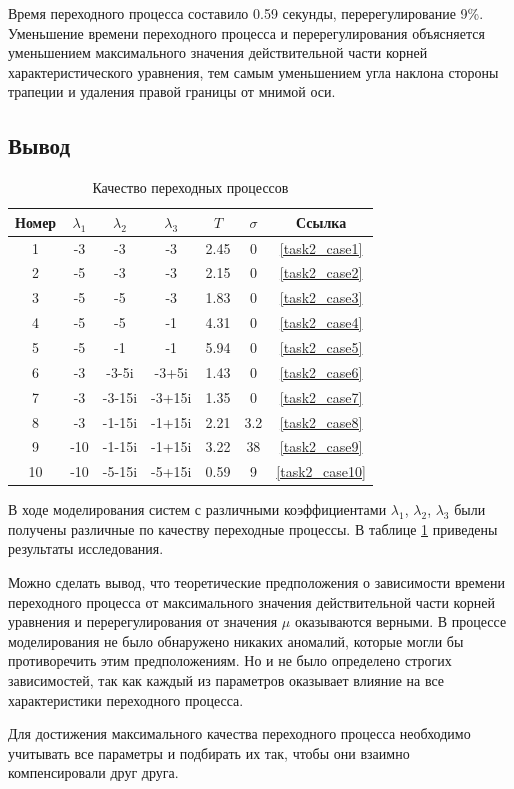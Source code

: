 Время переходного процесса составило 0.59 секунды, перерегулирование 9\%.
Уменьшение времени переходного процесса и перерегулирования объясняется уменьшением
максимального значения действительной части корней характеристического уравнения, 
тем самым уменьшением угла наклона стороны трапеции и удаления правой границы от мнимой оси.

\FloatBarrier
\subsection{Вывод}
\begin{table}[ht!]
    \centering
    \begin{tabular}{|c|c|c|c|c|c|c|}
        \hline
        Номер & $\lambda_1$ & $\lambda_2$ & $\lambda_3$ & $T$ & $\sigma$ & Ссылка  \\
        \hline
        1 & -3 & -3 & -3 & 2.45 & 0 & \ref{task2_case1} \\
        \hline
        2 & -5 & -3 & -3 & 2.15 & 0 & \ref{task2_case2} \\
        \hline
        3 & -5 & -5 & -3 & 1.83 & 0 & \ref{task2_case3} \\
        \hline
        4 & -5 & -5 & -1 & 4.31 & 0 & \ref{task2_case4} \\
        \hline
        5 & -5 & -1 & -1 & 5.94 & 0 & \ref{task2_case5} \\
        \hline
        6 & -3 & -3-5i & -3+5i & 1.43 & 0 & \ref{task2_case6} \\
        \hline
        7 & -3 & -3-15i & -3+15i & 1.35 & 0 & \ref{task2_case7} \\
        \hline
        8 & -3 & -1-15i & -1+15i & 2.21 & 3.2 & \ref{task2_case8} \\
        \hline
        9 & -10 & -1-15i & -1+15i & 3.22 & 38 & \ref{task2_case9} \\
        \hline
        10 & -10 & -5-15i & -5+15i & 0.59 & 9 & \ref{task2_case10} \\
        \hline
    \end{tabular}
    \caption{Качество переходных процессов}
    \label{tab:quality}
\end{table}

В ходе моделирования систем с различными коэффициентами $\lambda_1$, $\lambda_2$, $\lambda_3$
были получены различные по качеству переходные процессы. В таблице \ref{tab:quality} приведены
результаты исследования. 

Можно сделать вывод, что теоретические предположения о зависимости времени переходного процесса
от максимального значения действительной части корней уравнения 
и перерегулирования от значения $\mu$ оказываются верными. В процессе моделирования не было 
обнаружено никаких аномалий, которые могли бы противоречить этим предположениям. Но и 
не было определено строгих зависимостей, так как каждый из параметров оказывает влияние на 
все характеристики переходного процесса. 

Для достижения максимального качества переходного процесса необходимо учитывать все параметры 
и подбирать их так, чтобы они взаимно компенсировали друг друга. 